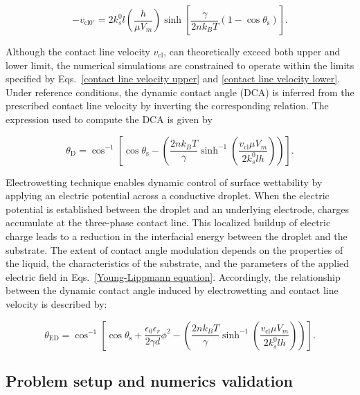 \documentclass[lineno]{cls/jfm}
\begin{document}
\begin{equation}
  - v_{\mathrm{cl} 0^\circ} = 2 k_s^0 l \left (  \frac{h}{\mu V_m} \right ) \sinh{\left[ \frac{\gamma}{2 n k_B T} ( 1 - \cos{\theta_{\mathrm{s}}} ) \right]}.
  \label{contact line velocity lower}
\end{equation}


\noindent Although the contact line velocity $v_{\mathrm{cl}}$, can theoretically exceed both upper and lower limit, the numerical simulations are constrained to operate within the limits specified by Eqs.~\ref{contact line velocity upper} and \ref{contact line velocity lower}. Under reference conditions, the dynamic contact angle (DCA) is inferred from the prescribed contact line velocity by inverting the corresponding relation. The expression used to compute the DCA is given by

\begin{equation}
  \theta_{\mathrm{D}} = \cos^{-1} \left[ \cos \theta_{\mathrm{s}} - \left( \frac{2n k_B T}{\gamma} \sinh^{-1} \left( \frac{v_{\mathrm{cl}} \mu V_m}{2k_s^0 l h} \right) \right) \right].
  \label{dynamic contact angle}
\end{equation}


Electrowetting technique enables dynamic control of surface wettability by applying an electric potential across a conductive droplet. When the electric potential is established between the droplet and an underlying electrode, charges accumulate at the three-phase contact line. This localized buildup of electric charge leads to a reduction in the interfacial energy between the droplet and the substrate. The extent of contact angle modulation depends on the properties of the liquid, the characteristics of the substrate, and the parameters of the applied electric field in Eqs.~\ref{Young-Lippmann equation}. Accordingly, the relationship between the dynamic contact angle induced by electrowetting and contact line velocity is described by:

\begin{equation}
  \theta_{\mathrm{ED}} = \cos^{-1} \left[ \cos\theta_{\mathrm{s}} + \frac{\epsilon_0 \epsilon_r}{2 \gamma d} \phi^2 - \left( \frac{2n k_B T}{\gamma} \sinh^{-1} \left( \frac{v_{\mathrm{cl}} \mu V_m}{2k_s^0 l h} \right) \right) \right].
  \label{dynamic contact angle induced by electrowetting}
\end{equation}




\subsection{Problem setup and numerics validation}
\end{document}
